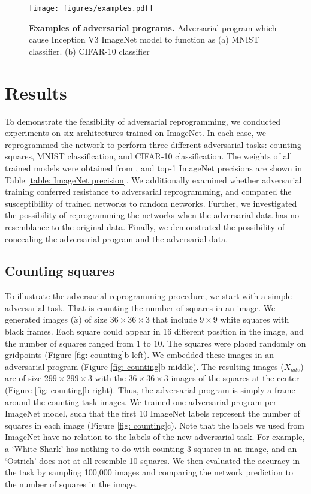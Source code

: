 \documentclass{article}
\begin{document}
\begin{figure}
\centering
\texttt{[image: figures/examples.pdf]}
\caption{{\bf Examples of adversarial programs.}
Adversarial program which cause Inception V3 ImageNet model to function as (a) MNIST classifier. (b) CIFAR-10 classifier}
\label{fig: ex}
\end{figure}\section{Results}\label{sec results}
To demonstrate the feasibility of adversarial reprogramming, 
we conducted experiments on six architectures trained on ImageNet. 
In each case, we reprogrammed the network to perform three different adversarial tasks: counting squares, MNIST classification, and CIFAR-10 classification. 
The weights of all trained models were obtained from \citet{tfslim}, and top-1 ImageNet precisions are shown in Table \ref{table: ImageNet precision}. 
We additionally examined whether adversarial training conferred resistance to adversarial reprogramming, and compared the susceptibility of trained networks to random networks. Further, we investigated the possibility of reprogramming the networks when the adversarial data has no resemblance to the original data. Finally, we demonstrated the possibility of concealing the adversarial program and the adversarial data.

\subsection{Counting squares}

To illustrate the adversarial reprogramming procedure, we start with a simple adversarial task. That is counting the number of squares in an image. 
We generated images ($\tilde x$) of size $36 \times 36 \times 3$ that include $9 \times 9$ white squares with black frames. Each square could appear in 16 different position in the image, and the number of squares ranged from $1$ to $10$. The squares were placed randomly on gridpoints (Figure \ref{fig: counting}b left). 
We embedded these images in an adversarial program (Figure \ref{fig: counting}b middle). 
The resulting images ($X_{adv}$) are of size $299 \times 299 \times 3$ with the $36 \times 36 \times 3$ images of the squares at the center (Figure \ref{fig: counting}b right). Thus, the adversarial program is simply a frame around the counting task images. 
We trained one adversarial program per ImageNet model, such that the first 10 ImageNet labels represent the number of squares in each image (Figure \ref{fig: counting}c). 
Note that the labels we used from ImageNet have no relation to the labels of the new adversarial task. For example, a `White Shark' has nothing to do with counting 3 squares in an image, and an `Ostrich' does not at all resemble 10 squares. 
We then evaluated the accuracy in the task by sampling 100,000 images and comparing the network prediction to the number of squares in the image. 
\end{document}
